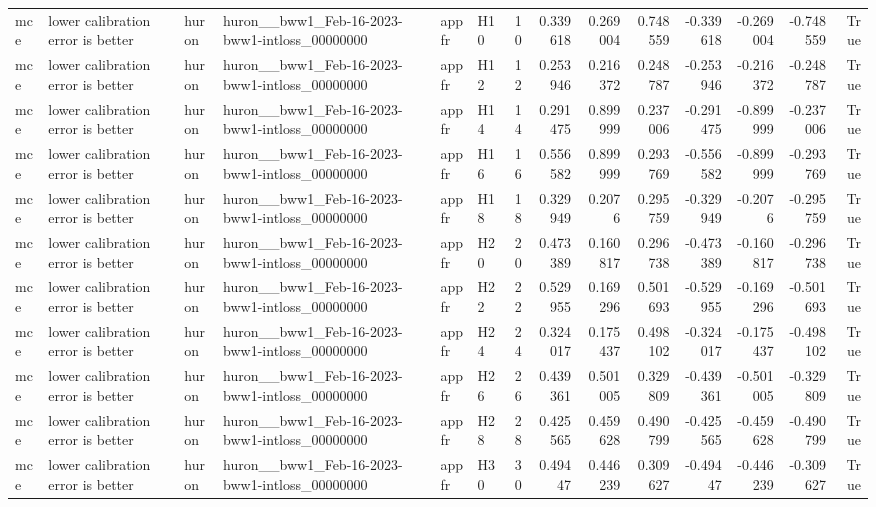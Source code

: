 \begin{longtable}{llllllrrrrrrrr}
mce & lower calibration error is better & huron & huron\_\_bww1\_Feb-16-2023-bww1-intloss\_00000000 & appfr & H10 & 10 & 0.339618 & 0.269004 & 0.748559 & -0.339618 & -0.269004 & -0.748559 & True \\
mce & lower calibration error is better & huron & huron\_\_bww1\_Feb-16-2023-bww1-intloss\_00000000 & appfr & H12 & 12 & 0.253946 & 0.216372 & 0.248787 & -0.253946 & -0.216372 & -0.248787 & True \\
mce & lower calibration error is better & huron & huron\_\_bww1\_Feb-16-2023-bww1-intloss\_00000000 & appfr & H14 & 14 & 0.291475 & 0.899999 & 0.237006 & -0.291475 & -0.899999 & -0.237006 & True \\
mce & lower calibration error is better & huron & huron\_\_bww1\_Feb-16-2023-bww1-intloss\_00000000 & appfr & H16 & 16 & 0.556582 & 0.899999 & 0.293769 & -0.556582 & -0.899999 & -0.293769 & True \\
mce & lower calibration error is better & huron & huron\_\_bww1\_Feb-16-2023-bww1-intloss\_00000000 & appfr & H18 & 18 & 0.329949 & 0.2076 & 0.295759 & -0.329949 & -0.2076 & -0.295759 & True \\
mce & lower calibration error is better & huron & huron\_\_bww1\_Feb-16-2023-bww1-intloss\_00000000 & appfr & H20 & 20 & 0.473389 & 0.160817 & 0.296738 & -0.473389 & -0.160817 & -0.296738 & True \\
mce & lower calibration error is better & huron & huron\_\_bww1\_Feb-16-2023-bww1-intloss\_00000000 & appfr & H22 & 22 & 0.529955 & 0.169296 & 0.501693 & -0.529955 & -0.169296 & -0.501693 & True \\
mce & lower calibration error is better & huron & huron\_\_bww1\_Feb-16-2023-bww1-intloss\_00000000 & appfr & H24 & 24 & 0.324017 & 0.175437 & 0.498102 & -0.324017 & -0.175437 & -0.498102 & True \\
mce & lower calibration error is better & huron & huron\_\_bww1\_Feb-16-2023-bww1-intloss\_00000000 & appfr & H26 & 26 & 0.439361 & 0.501005 & 0.329809 & -0.439361 & -0.501005 & -0.329809 & True \\
mce & lower calibration error is better & huron & huron\_\_bww1\_Feb-16-2023-bww1-intloss\_00000000 & appfr & H28 & 28 & 0.425565 & 0.459628 & 0.490799 & -0.425565 & -0.459628 & -0.490799 & True \\
mce & lower calibration error is better & huron & huron\_\_bww1\_Feb-16-2023-bww1-intloss\_00000000 & appfr & H30 & 30 & 0.49447 & 0.446239 & 0.309627 & -0.49447 & -0.446239 & -0.309627 & True \\

\end{longtable}
